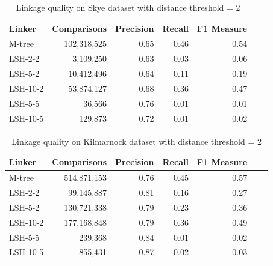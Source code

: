 \documentclass{llncs}
\begin{document}
\begin{table}[ht]
\centering
\begin{tabular}{l|r|r|r|r}
\parbox{0.2\textwidth}{\centering Linker} &
\parbox{0.2\textwidth}{\centering Comparisons} &
\parbox{0.17\textwidth}{\centering Precision} &
\parbox{0.17\textwidth}{\centering Recall} &
\parbox{0.17\textwidth}{\centering F1 Measure} \\ \hline \hline
M-tree    & 102,318,525                 & 0.65      & 0.46   & 0.54      \\ \hline

LSH-2-2  & 3,109,250                   & 0.63      & 0.03   & 0.06       \\

LSH-5-2  & 10,412,496                  & 0.64      & 0.11   & 0.19       \\

LSH-10-2 & 53,874,127                  & 0.68      & 0.36   & 0.47       \\

LSH-5-5  & 36,566                     & 0.76      & 0.01   & 0.01       \\

LSH-10-5 & 129,873                    & 0.72      & 0.01   & 0.02       \\ \hline
\end{tabular}
\caption{Linkage quality on Skye dataset with distance threshold = 2
\label{comparison-of-results-demography-skye}
}
\end{table}


\begin{table}[ht]
\centering
\begin{tabular}{l|r|r|r|r|r|r}
\parbox{0.2\textwidth}{\centering Linker} &
\parbox{0.2\textwidth}{\centering Comparisons} &
\parbox{0.17\textwidth}{\centering Precision} &
\parbox{0.17\textwidth}{\centering Recall} &
\parbox{0.17\textwidth}{\centering F1 Measure} \\ \hline \hline
M-tree     & 514,871,153                   & 0.76      & 0.45   & 0.57      \\ \hline
LSH-2-2   & 99,145,887                    & 0.81      & 0.16   & 0.27       \\
LSH-5-2   & 130,721,338                   & 0.79      & 0.23   & 0.36       \\
LSH-10-2  & 177,168,848                   & 0.79      & 0.36   & 0.49       \\
LSH-5-5   & 239,368                      & 0.84      & 0.01   & 0.02       \\
LSH-10-5  & 855,431                      & 0.87      & 0.02   & 0.03 \\ \hline
\end{tabular}
\caption{Linkage quality on Kilmarnock dataset with distance threshold = 2
\label{comparison-of-results-demography-kili}
}
\end{table}
\end{document}
